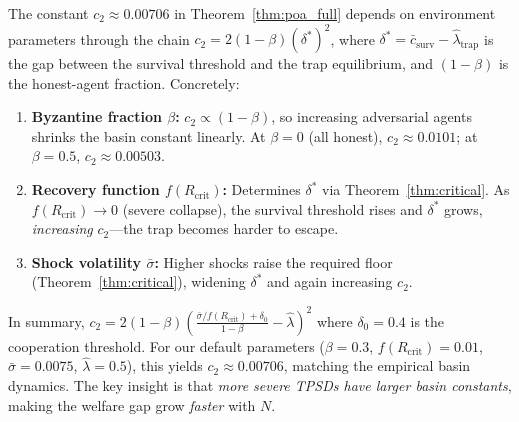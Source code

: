\begin{remark}
\label{rem:basin_constant}
The constant $c_2 \approx 0.00706$ in Theorem~\ref{thm:poa_full} depends on environment parameters through the chain $c_2 = 2(1{-}\beta)(\delta^*)^2$, where $\delta^* = \bar{c}_{\text{surv}} - \hat{\lambda}_{\text{trap}}$ is the gap between the survival threshold and the trap equilibrium, and $(1{-}\beta)$ is the honest-agent fraction. Concretely:
\begin{enumerate}[nosep]
\item \textbf{Byzantine fraction $\beta$:} $c_2 \propto (1{-}\beta)$, so increasing adversarial agents shrinks the basin constant linearly.  At $\beta{=}0$ (all honest), $c_2 \approx 0.0101$; at $\beta{=}0.5$, $c_2 \approx 0.00503$.
\item \textbf{Recovery function $f(R_{\text{crit}})$:} Determines $\delta^*$ via Theorem~\ref{thm:critical}. As $f(R_{\text{crit}}) \to 0$ (severe collapse), the survival threshold rises and $\delta^*$ grows, \emph{increasing} $c_2$---the trap becomes harder to escape.
\item \textbf{Shock volatility $\bar{\sigma}$:} Higher shocks raise the required floor (Theorem~\ref{thm:critical}), widening $\delta^*$ and again increasing $c_2$.
\end{enumerate}
In summary, $c_2 = 2(1{-}\beta)\left(\frac{\bar{\sigma}/f(R_{\text{crit}}) + \delta_0}{1{-}\beta} - \hat{\lambda}\right)^2$ where $\delta_0{=}0.4$ is the cooperation threshold. For our default parameters ($\beta{=}0.3$, $f(R_{\text{crit}}){=}0.01$, $\bar{\sigma}{=}0.0075$, $\hat{\lambda}{=}0.5$), this yields $c_2 \approx 0.00706$, matching the empirical basin dynamics. The key insight is that \emph{more severe TPSDs have larger basin constants}, making the welfare gap grow \emph{faster} with $N$.
\end{remark}


